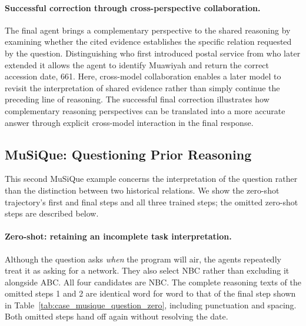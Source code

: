 \paragraph{Successful correction through cross-perspective collaboration.}
The final agent brings a complementary perspective to the shared reasoning by examining whether the cited evidence establishes the specific relation requested by the question. Distinguishing who first introduced postal service from who later extended it allows the agent to identify Muawiyah and return the correct accession date, 661. Here, cross-model collaboration enables a later model to revisit the interpretation of shared evidence rather than simply continue the preceding line of reasoning. The successful final correction illustrates how complementary reasoning perspectives can be translated into a more accurate answer through explicit cross-model interaction in the final response.

\FloatBarrier

\noindent\begin{minipage}{\linewidth}
\subsection{MuSiQue: Questioning Prior Reasoning}
\label{app:case_musique_question}

This second MuSiQue example concerns the interpretation of the question rather than the distinction between two historical relations. We show the zero-shot trajectory's first and final steps and all three trained steps; the omitted zero-shot steps are described below.

\begingroup
\setlength{\fboxsep}{7pt}
\endgroup
\end{minipage}\par

\paragraph{Zero-shot: retaining an incomplete task interpretation.}
Although the question asks \emph{when} the program will air, the agents repeatedly treat it as asking for a network. They also select NBC rather than excluding it alongside ABC. All four candidates are NBC. The complete reasoning texts of the omitted steps 1 and 2 are identical word for word to that of the final step shown in Table~\ref{tab:case_musique_question_zero}, including punctuation and spacing. Both omitted steps hand off again without resolving the date.

